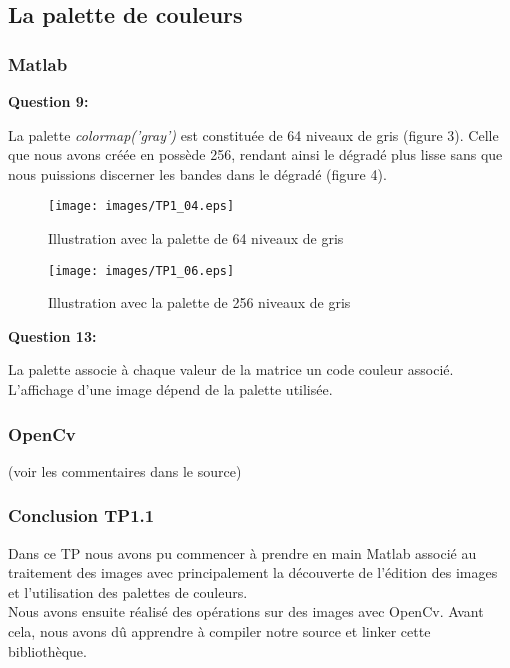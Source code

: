 \documentclass{article}
\begin{document}
  \subsection{La palette de couleurs}
  \subsubsection{Matlab}
 
 \textbf{Question 9:}
 
 La palette \emph{colormap('gray')} est constituée de 64 niveaux de gris (figure 3). Celle que nous avons créée en possède 256, rendant ainsi le dégradé plus lisse sans que nous puissions discerner les bandes dans le dégradé (figure 4). \\
 
 \begin{figure}[h!]
    \begin{center}
	  \texttt{[image: images/TP1\_04.eps]}
	\end{center}
	\caption{Illustration avec la palette de 64 niveaux de gris}
  \end{figure}
 
  \begin{figure}[h!]
    \begin{center}
	  \texttt{[image: images/TP1\_06.eps]}
	\end{center}
	\caption{Illustration avec la palette de 256 niveaux de gris}
  \end{figure}
 
 \textbf{Question 13:}
 
 La palette associe à chaque valeur de la matrice un code couleur associé. L'affichage d'une image dépend de la palette utilisée.
 
 
 \subsubsection{OpenCv}
 (voir les commentaires dans le source)
 
 
 \subsubsection{Conclusion TP1.1}
  Dans ce TP nous avons pu commencer à prendre en main Matlab associé au traitement des images avec principalement la découverte de l'édition des images et l'utilisation des palettes de couleurs.\\
  
  Nous avons ensuite réalisé des opérations sur des images avec OpenCv. Avant cela, nous avons dû apprendre à compiler notre source et linker cette bibliothèque. \newpage
  
\end{document}
